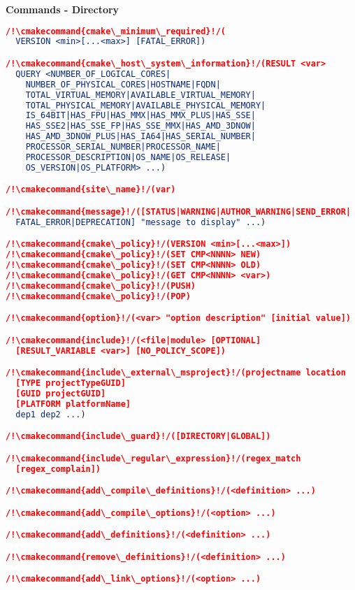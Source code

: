 \documentclass{article}
\newcommand{\cmakecommand}[1]{{\href{https://cmake.org/cmake/help/v3.20/command/#1.html}{#1}}}
\begin{document}
\tiny

\begin{minipage}[t]{0.18\linewidth}
\textbf{Commands - Directory}
\begin{lstlisting}[language=CMake]
/!\cmakecommand{cmake\_minimum\_required}!/(
  VERSION <min>[...<max>] [FATAL_ERROR])

/!\cmakecommand{cmake\_host\_system\_information}!/(RESULT <var>
  QUERY <NUMBER_OF_LOGICAL_CORES|
    NUMBER_OF_PHYSICAL_CORES|HOSTNAME|FQDN|
    TOTAL_VIRTUAL_MEMORY|AVAILABLE_VIRTUAL_MEMORY|
    TOTAL_PHYSICAL_MEMORY|AVAILABLE_PHYSICAL_MEMORY|
    IS_64BIT|HAS_FPU|HAS_MMX|HAS_MMX_PLUS|HAS_SSE|
    HAS_SSE2|HAS_SSE_FP|HAS_SSE_MMX|HAS_AMD_3DNOW|
    HAS_AMD_3DNOW_PLUS|HAS_IA64|HAS_SERIAL_NUMBER|
    PROCESSOR_SERIAL_NUMBER|PROCESSOR_NAME|
    PROCESSOR_DESCRIPTION|OS_NAME|OS_RELEASE|
    OS_VERSION|OS_PLATFORM> ...)

/!\cmakecommand{site\_name}!/(var)

/!\cmakecommand{message}!/([STATUS|WARNING|AUTHOR_WARNING|SEND_ERROR|
  FATAL_ERROR|DEPRECATION] "message to display" ...)

/!\cmakecommand{cmake\_policy}!/(VERSION <min>[...<max>])
/!\cmakecommand{cmake\_policy}!/(SET CMP<NNNN> NEW)
/!\cmakecommand{cmake\_policy}!/(SET CMP<NNNN> OLD)
/!\cmakecommand{cmake\_policy}!/(GET CMP<NNNN> <var>)
/!\cmakecommand{cmake\_policy}!/(PUSH)
/!\cmakecommand{cmake\_policy}!/(POP)

/!\cmakecommand{option}!/(<var> "option description" [initial value])

/!\cmakecommand{include}!/(<file|module> [OPTIONAL]
  [RESULT_VARIABLE <var>] [NO_POLICY_SCOPE])

/!\cmakecommand{include\_external\_msproject}!/(projectname location
  [TYPE projectTypeGUID]
  [GUID projectGUID]
  [PLATFORM platformName]
  dep1 dep2 ...)

/!\cmakecommand{include\_guard}!/([DIRECTORY|GLOBAL])

/!\cmakecommand{include\_regular\_expression}!/(regex_match
  [regex_complain])

/!\cmakecommand{add\_compile\_definitions}!/(<definition> ...)

/!\cmakecommand{add\_compile\_options}!/(<option> ...)

/!\cmakecommand{add\_definitions}!/(<definition> ...)

/!\cmakecommand{remove\_definitions}!/(<definition> ...)

/!\cmakecommand{add\_link\_options}!/(<option> ...)


\end{lstlisting}
\end{minipage}
\end{document}
